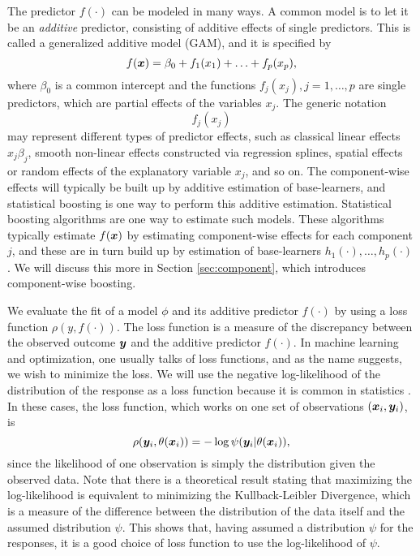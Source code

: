 The predictor $f(\cdot)$ can be modeled in many ways.
A common model is to let it be an \textit{additive} predictor, consisting of additive effects of single predictors.
This is called a generalized additive model (GAM), and it is specified by
\begin{equation}\label{eq:gam}
    f(\bm{x})=\beta_0+f_1(x_1)+\ldots+f_p(x_p),
\end{equation}
where $\beta_0$ is a common intercept and the functions $f_j(x_j),j=1,\ldots,p$ are single predictors, which are partial effects of the variables $x_j$.
The generic notation
\begin{equation*}
    f_j(x_j)
\end{equation*}
may represent different types of predictor effects, such as classical linear effects $x_j\beta_j$, smooth non-linear effects constructed via regression splines, spatial effects or random effects of the explanatory variable $x_j$, and so on. 
The component-wise effects will typically be built up by additive estimation of base-learners, and statistical boosting is one way to perform this additive estimation.
Statistical boosting algorithms are one way to estimate such models.
These algorithms typically estimate $f(\bm{x})$ by estimating component-wise effects for each component $j$, and these are in turn build up by estimation of base-learners $h_1(\cdot),\ldots,h_p(\cdot)$.
We will discuss this more in Section \ref{sec:component}, which introduces component-wise boosting.

We evaluate the fit of a model $\phi$ and its additive predictor $f(\cdot)$ by using a loss function $\rho(y,f(\cdot))$.
The loss function is a measure of the discrepancy between the observed outcome $\bm{y}$ and the additive predictor $f(\cdot)$.
In machine learning and optimization, one usually talks of loss functions, and as the name suggests, we wish to minimize the loss.
We will use the negative log-likelihood of the distribution of the response as a loss function because it is common in statistics \citep{mayr14a}.
In these cases, the loss function, which works on one set of observations $(\bm{x}_i,\bm{y}_i)$, is
\begin{equation*}
    \rho(\bm{y}_i,\theta(\bm{x}_i))=-\log{\psi(\bm{y}_i|\theta(\bm{x}_i))},
\end{equation*}
since the likelihood of one observation is simply the distribution given the observed data.
Note that there is a theoretical result stating that maximizing the log-likelihood is equivalent to minimizing the Kullback-Leibler Divergence, which is a measure of the difference between the distribution of the data itself and the assumed distribution $\psi$.
This shows that, having assumed a distribution $\psi$ for the responses, it is a good choice of loss function to use the log-likelihood of $\psi$.

